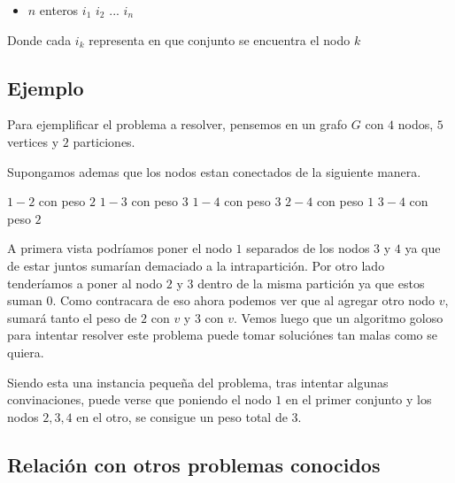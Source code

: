 \begin{itemize}

\item $n$ enteros $i_1$ $i_2$ $...$ $i_n$

\end{itemize}

Donde cada $i_k$ representa en que conjunto se encuentra el nodo $k$

\subsection{Ejemplo}

Para ejemplificar el problema a resolver, pensemos en un grafo $G$ con $4$ nodos, $5$ vertices y $2$ particiones.

Supongamos ademas que los nodos estan conectados de la siguiente manera.

$1-2$ con peso $2$
$1-3$ con peso $3$
$1-4$ con peso $3$
$2-4$ con peso $1$
$3-4$ con peso $2$

A primera vista podríamos poner el nodo $1$ separados de los nodos $3$ y $4$ ya que de estar juntos sumarían demaciado a la intrapartición. Por otro lado tenderíamos a poner al nodo $2$ y $3$ dentro de la misma partición ya que estos suman $0$. Como contracara de eso ahora podemos ver que al agregar otro nodo $v$, sumará tanto el peso de $2$ con $v$ y $3$ con $v$. Vemos luego que un algoritmo goloso para intentar resolver este problema puede tomar soluciónes tan malas como se quiera.

Siendo esta una instancia pequeña del problema, tras intentar algunas convinaciones, puede verse que poniendo el nodo $1$ en el primer conjunto y los nodos $2,3,4$ en el otro, se consigue un peso total de $3$.

\subsection{Relación con otros problemas conocidos}

